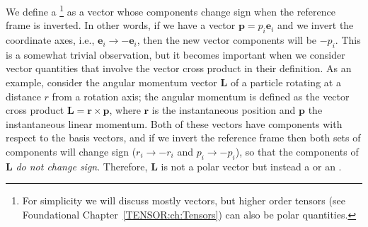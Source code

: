 We define a \footnote{For simplicity we will discuss mostly vectors, but higher order tensors (see Foundational Chapter~\ref{TENSOR:ch:Tensors}) can also be polar quantities.} as a vector whose components change sign when the reference frame is inverted.  In other words, if we have a vector $\mathbf{p}=p_i\mathbf{e}_i$ and we invert the coordinate axes, i.e., $\mathbf{e}_i\rightarrow -\mathbf{e}_i$, then the new vector components will be $-p_i$.  This is a somewhat trivial observation, but it becomes important when we consider vector quantities that involve the vector cross product in their definition.  As an example, consider the angular momentum vector $\mathbf{L}$ of a particle rotating at a distance $r$ from a rotation axis; the angular momentum is defined as the vector cross product $\mathbf{L}=\mathbf{r}\times\mathbf{p}$, where $\mathbf{r}$ is the instantaneous position and $\mathbf{p}$ the instantaneous linear momentum.  Both of these vectors have components with respect to the basis vectors, and if we invert the reference frame then both sets of components will change sign ($r_i\rightarrow -r_i$ and $p_i\rightarrow -p_i$), so that the components of $\mathbf{L}$ \textit{do not change sign}.  Therefore, $\mathbf{L}$ is not a polar vector but instead a  or an .  

